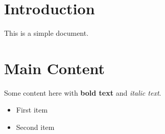 \documentclass{article}
\begin{document}
\section{Introduction}
This is a simple document.

\section{Main Content}
Some content here with \textbf{bold text} and \textit{italic text}.

\begin{itemize}
\item First item
\item Second item
\end{itemize}
\end{document}

